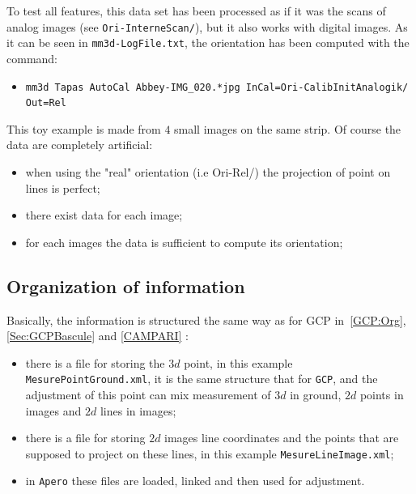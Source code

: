 To test all features, this data set has been processed as if it was the scans of analog images
(see {\tt Ori-InterneScan/}), but it also works with digital images. As it can be seen in {\tt mm3d-LogFile.txt},
the orientation has been computed with the command:

\begin{itemize}
   \item {\tt mm3d Tapas AutoCal Abbey-IMG\_020.*jpg InCal=Ori-CalibInitAnalogik/ Out=Rel}

\end{itemize}

This toy example is made from $4$ small images on the same strip. Of course the data are completely  artificial:

\begin{itemize}
   \item when using the "real" orientation (i.e Ori-Rel/) the projection of point on lines is perfect;
   \item there exist data for each image;
   \item for each images the data is sufficient to compute its orientation;
\end{itemize}


\subsection{Organization of information}

Basically, the information is structured the same way as for GCP in~\ref{GCP:Org},\ref{Sec:GCPBascule} and
\ref{CAMPARI} :

\begin{itemize}
   \item there is a file for storing the $3d$ point, in this example {\tt MesurePointGround.xml}, it is the same
         structure that for {\tt GCP}, and the adjustment of this point can mix measurement of $3d$ in ground,
         $2d$ points in images and $2d$ lines in images;

   \item there is a file for storing $2d$ images line coordinates and the points that are supposed to project
         on these lines, in this example {\tt MesureLineImage.xml};

   \item in {\tt Apero} these files are loaded, linked and then used for adjustment.
\end{itemize}

